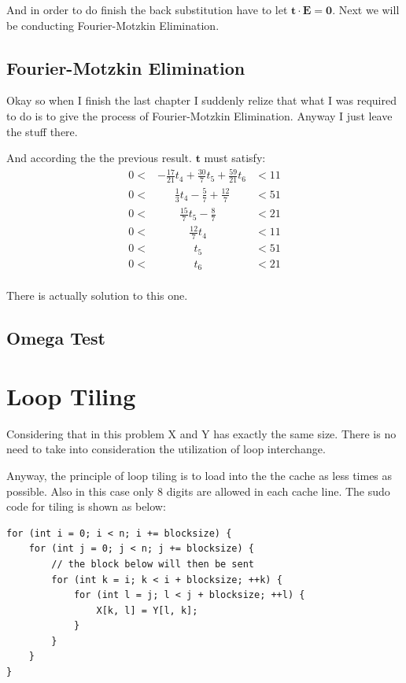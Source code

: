 \documentclass[12pt]{article}
\begin{document}
And in order to do finish the back substitution have to let
$\pmb{t\cdot E = 0}$. Next we will be conducting Fourier-Motzkin
Elimination.

\subsection{Fourier-Motzkin Elimination}
Okay so when I finish the last chapter I suddenly relize that what I
was required to do is to give the process of Fourier-Motzkin
Elimination. Anyway I just leave the stuff there.

And according the the previous result. $\pmb{t}$ must satisfy:
\begin{equation}
  \begin{aligned}
    0 <& -\frac{17}{21}t_4 + \frac{30}{7}t_5 + \frac{59}{21}t_6 &< 11 \\
    0 <& ~~~~~~~\frac{1}{3}t_4 - \frac{5}{7} + \frac{12}{7} &< 51 \\
0 <&~~~~~~~~~\frac{15}{7}t_5 - \frac{8}{7}  &< 21 \\
0 <& ~~~~~~~~~~~~~\frac{12}{7}t_4   &<  11 \\
0 <& ~~~~~~~~~~~~~~~t_5 &< 51 \\
0 <& ~~~~~~~~~~~~~~~ t_6 &< 21 \\
  \end{aligned}
\end{equation}

There is actually solution to this one.


\subsection{Omega Test}



\section{Loop Tiling}

Considering that in this problem X and Y has exactly the same size. There is no need to take into consideration
the utilization of loop interchange.

Anyway, the principle of loop tiling is to load  into the
the cache as less times  as possible. Also in this case only 8 digits
are allowed in each cache line. The sudo code for tiling is shown as
below:

\begin{verbatim}
for (int i = 0; i < n; i += blocksize) {
    for (int j = 0; j < n; j += blocksize) {
        // the block below will then be sent
        for (int k = i; k < i + blocksize; ++k) {
            for (int l = j; l < j + blocksize; ++l) {
                X[k, l] = Y[l, k];
            }
        }
    }
}
\end{verbatim}
\end{document}
